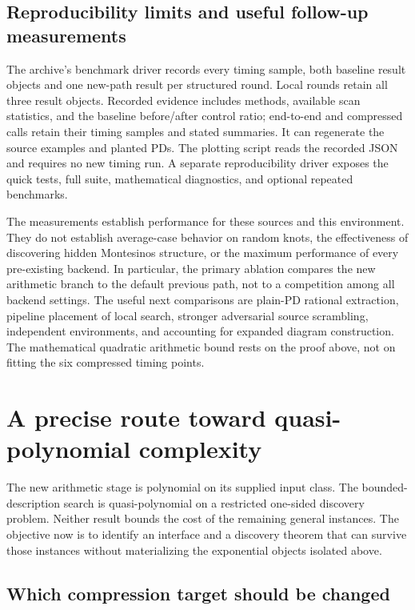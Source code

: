 \documentclass[11pt,a4paper]{article}
\theoremstyle{definition}
\theoremstyle{remark}
\numberwithin{equation}{section}
\begin{document}
\subsection{Reproducibility limits and useful follow-up measurements}

The archive's benchmark driver records every timing sample, both baseline
result objects and one new-path result per structured round. Local rounds
retain all three result objects. Recorded evidence includes methods, available
scan statistics, and the baseline before/after control ratio; end-to-end
and compressed calls retain their timing samples and stated summaries. It can regenerate the source examples and
planted PDs. The plotting script reads the recorded JSON and requires no
new timing run. A separate reproducibility driver exposes the quick tests,
full suite, mathematical diagnostics, and optional repeated benchmarks.

The measurements establish performance for these sources and this
environment. They do not establish average-case behavior on random knots,
the effectiveness of discovering hidden Montesinos structure, or the
maximum performance of every pre-existing backend. In particular, the
primary ablation compares the new arithmetic branch to the default
previous path, not to a competition among all backend settings.
The useful next comparisons are plain-PD rational extraction, pipeline
placement of local search, stronger adversarial source scrambling,
independent environments, and accounting for expanded diagram construction.
The mathematical quadratic arithmetic bound rests on the proof above,
not on fitting the six compressed timing points.

\section{A precise route toward quasi-polynomial complexity}
\label{sec:roadmap}

The new arithmetic stage is polynomial on its supplied input class.
The bounded-description search is quasi-polynomial on a restricted
one-sided discovery problem. Neither result bounds the cost of the
remaining general instances. The objective now is to identify an interface
and a discovery theorem that can survive those instances without
materializing the exponential objects isolated above.

\subsection{Which compression target should be changed}
\end{document}
